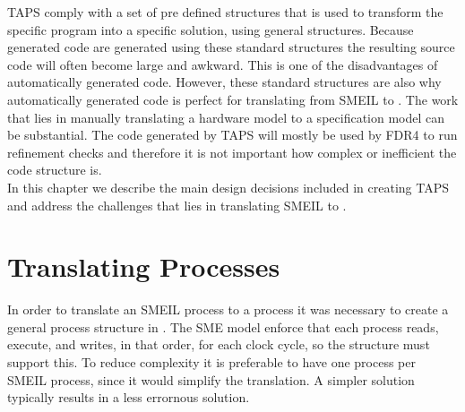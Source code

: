 TAPS comply with a set of pre defined structures that is used to transform the specific program into a specific solution, using general structures. Because generated code are generated using these standard structures the resulting source code will often become large and awkward. This is one of the disadvantages of automatically generated code. However, these standard structures are also why automatically generated code is perfect for translating from SMEIL to \cspm{}. The work that lies in manually translating a hardware model to a specification model can be substantial. The code generated by TAPS will mostly be used by FDR4 to run refinement checks and therefore it is not important how complex or inefficient the code structure is. \\

In this chapter we describe the main design decisions included in creating TAPS and address the challenges that lies in translating SMEIL to \cspm{}.
\section{Translating Processes}
In order to translate an SMEIL process to a \cspm{} process it was necessary to create a general process structure in \cspm{}. The SME model enforce that each process reads, execute, and writes, in that order, for each clock cycle, so the \cspm{} structure must support this. To reduce complexity it is preferable to have one \cspm{} process per SMEIL process, since it would simplify the translation. A simpler solution typically results in a less errornous solution.\\

